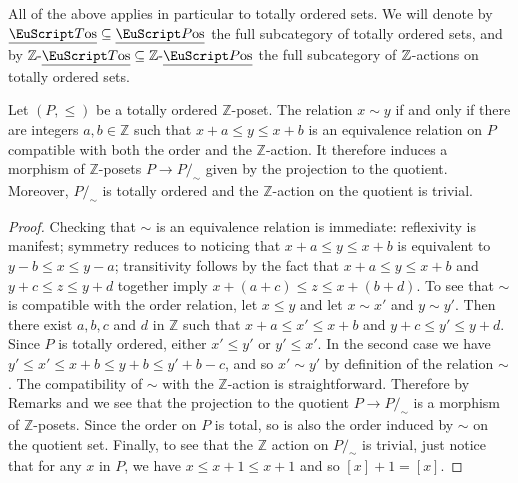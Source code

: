 All of the above applies in particular to totally ordered sets. We will denote by $\Tos\subseteq \Pos$ the full subcategory of totally ordered sets, and by $\mathbb{Z}\text{-}\Tos\subseteq \ZPos$ the full subcategory of $\mathbb{Z}$-actions on totally ordered sets.

\begin{lemma}\label{equivalence}
Let $(P, \leq)$ be a totally ordered $\mathbb{Z}$-poset. The relation $x\sim y$ if and only if there are integers $a,b \in \mathbb{Z}$ such that $x + a \le y \le x + b $ is an equivalence relation on $P$ compatible with both the order and the $\mathbb{Z}$-action. It therefore induces a morphism of $\mathbb{Z}$-posets $P\to P/_{\!\sim}$ given by the projection to the quotient. Moreover, $P/_{\!\sim}$ is totally ordered and the $\mathbb{Z}$-action on the quotient is trivial.
\end{lemma}
\begin{proof}
Checking that $\sim$ is an equivalence relation is immediate: reflexivity is manifest; symmetry reduces to noticing that $x + a \le y \le x + b $ is equivalent to $y-b\leq x\leq y-a$; transitivity follows by  the fact that $x + a \le y \le x + b $ and $y + c \le z \le y + d$ together imply $x+ (a+ c) \le z \le x+(b + d)$. To see that $\sim$ is compatible with the order relation, let $x\leq y$ and let $x\sim x'$ and $y\sim y'$. Then there exist $a, b, c$ and $d$ in $\mathbb{Z}$ such that $x + a \le x' \le x + b $ and $y + c \le y' \le y + d$. Since $P$ is totally ordered, either $x'\leq y'$ or $y'\leq x'$. In the second case we have $y'\leq x'  \le x + b\le y+b \le y'+b-c$, and so $x'\sim y'$ by definition of the relation $\sim$. The compatibility of $\sim$ with the $\mathbb{Z}$-action is straightforward. Therefore by Remarks  and  we see that the projection to the quotient $P\to P/_{\!\sim}$ is a morphism of $\mathbb{Z}$-posets. Since the order on $P$ is total, so is also the order induced by $\sim$ on the quotient set. Finally, to see that the $\mathbb{Z}$ action on $P/_{\!\sim}$ is trivial, just notice that for any $x$ in $P$, we have $x\leq x+1\leq x+1$ and so $[x]+1=[x]$.
\end{proof}

